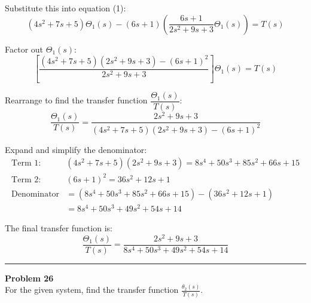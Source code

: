 \documentclass[11pt]{article}
\begin{document}
Substitute this into equation (1):
\[
(4s^2 + 7s + 5)\Theta_1(s) - (6s + 1) \left( \frac{6s + 1}{2s^2 + 9s + 3} \Theta_1(s) \right) = T(s)
\]

Factor out $\Theta_1(s)$:
\[
\left[ \frac{(4s^2 + 7s + 5)(2s^2 + 9s + 3) - (6s + 1)^2}{2s^2 + 9s + 3} \right] \Theta_1(s) = T(s)
\]

Rearrange to find the transfer function $\dfrac{\Theta_1(s)}{T(s)}$:
\[
\frac{\Theta_1(s)}{T(s)} = \frac{2s^2 + 9s + 3}{(4s^2 + 7s + 5)(2s^2 + 9s + 3) - (6s + 1)^2}
\]

Expand and simplify the denominator:
\begin{align*}
    \text{Term 1: } & (4s^2+7s+5)(2s^2+9s+3) = 8s^4 + 50s^3 + 85s^2 + 66s + 15 \\
    \text{Term 2: } & (6s+1)^2 = 36s^2 + 12s + 1 \\
    \text{Denominator} &= (8s^4 + 50s^3 + 85s^2 + 66s + 15) - (36s^2 + 12s + 1) \\
    &= 8s^4 + 50s^3 + 49s^2 + 54s + 14
\end{align*}

The final transfer function is:
\[
\boxed{\frac{\Theta_1(s)}{T(s)} = \frac{2s^2 + 9s + 3}{8s^4 + 50s^3 + 49s^2 + 54s + 14}}
\]


\newpage
  \setcounter{page}{52}  
\noindent\rule{\textwidth}{1pt}
\noindent\textbf{Problem 26} \hfill 
\\ For the given system, find the transfer function $\frac{\theta_2(s)}{T(s)}$.
\end{document}
